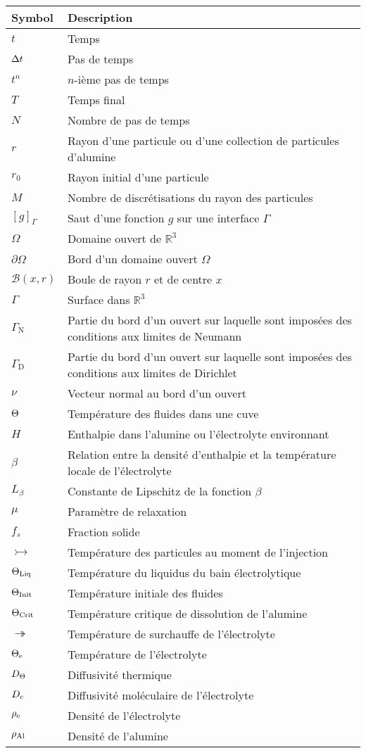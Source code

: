 \begin{tabularx}{\textwidth}{@{}lX@{}}
  \toprule
  Symbol & Description \\
  \midrule
  $t$ & Temps \\
  $\Delta t$ & Pas de temps \\
  $t^n$ & $n$-ième pas de temps\\
  $T$ & Temps final \\
  $N$ & Nombre de pas de temps \\
  $r$ & Rayon d'une particule ou d'une collection de particules d'alumine \\
  $r_0$ & Rayon initial d'une particule \\
  $M$ & Nombre de discrétisations du rayon des particules \\
  $ [g]_\Gamma $ & Saut d'une fonction $g$ sur une interface $\Gamma$\\
  $\Omega$ & Domaine ouvert de $\mathbb R^3$ \\
  $\partial\Omega$ & Bord d'un domaine ouvert $\Omega$\\
  $\mathcal B(x, r)$ & Boule de rayon $r$ et de centre $x$\\
  $\Gamma$ & Surface dans $\mathbb R^3$\\
  $\Gamma_\mathrm{N}$ & Partie du bord d'un ouvert sur laquelle sont imposées des conditions aux limites de Neumann\\
  $\Gamma_\mathrm{D}$ & Partie du bord d'un ouvert sur laquelle sont imposées des conditions aux limites de Dirichlet\\
  $\nu$ & Vecteur normal au bord d'un ouvert\\
  $\Theta$ & Température des fluides dans une cuve\\
  $H$ & Enthalpie dans l'alumine ou l'électrolyte environnant \\
  $\beta$ & Relation entre la densité d'enthalpie et la température locale de l'électrolyte\\
  $L_\beta$ & Constante de Lipschitz de la fonction $\beta$ \\
  $\mu$ & Paramètre de relaxation \\
  $f_s$ & Fraction solide \\
  $\tinj$ & Température des particules au moment de l'injection\\
  $\Theta_\text{Liq}$ & Température du liquidus du bain électrolytique \\
  $\Theta_\text{Init}$ & Température initiale des fluides\\
  $\Theta_\text{Crit}$ & Température critique de dissolution de l'alumine\\
  $\tsur$ & Température de surchauffe de l'électrolyte\\
  $\Theta_\mathrm{e}$ & Température de l'électrolyte\\
  $D_\Theta$ & Diffusivité thermique\\
  $D_c$ & Diffusivité moléculaire de l'électrolyte\\
  ${\rho_\text{e}}$ & Densité de l'électrolyte\\
  ${\rho_\text{Al}}$ & Densité de l'alumine\\
  \bottomrule
\end{tabularx}


